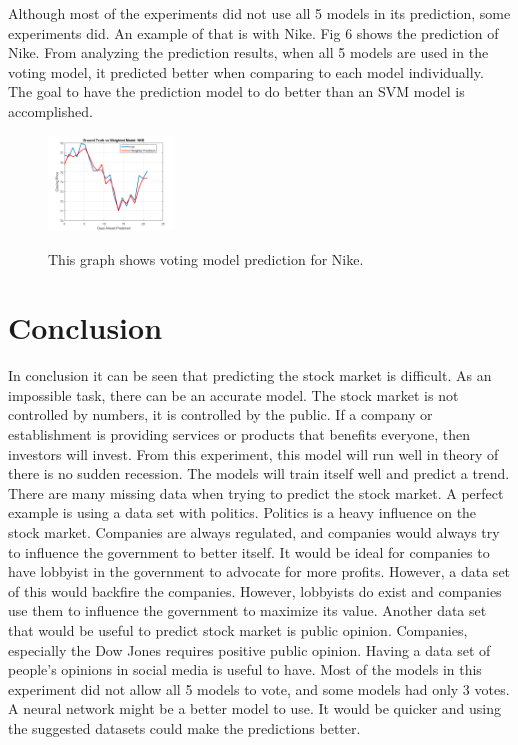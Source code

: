 \documentclass[journal]{IEEEtran}
\begin{document}
Although most of the experiments did not use all 5 models in its prediction, some experiments did. An example of that is with Nike. Fig 6 shows the prediction of Nike. From analyzing the prediction results, when all 5 models are used in the voting model, it predicted better when comparing to each model individually. The goal to have the prediction model to do better than an SVM model is accomplished. 

\begin{figure}[H]
\centering
\includegraphics[width = 0.3\textwidth]{nke.png}
\label{nike}
\caption{This graph shows voting model prediction for Nike.}
\end{figure}

\section{Conclusion}
In conclusion it can be seen that predicting the stock market is difficult. As an impossible task, there can be an accurate model. The stock market is not controlled by numbers, it is controlled by the public. If a company or establishment is providing services or products that benefits everyone, then investors will invest. From this experiment, this model will run well in theory of there is no sudden recession. The models will train itself well and predict a trend. There are many missing data when trying to predict the stock market. A perfect example is using a data set with politics. Politics is a heavy influence on the stock market. Companies are always regulated, and companies would always try to influence the government to better itself. It would be ideal for companies to have lobbyist in the government to advocate for more profits. However, a data set of this would backfire the companies. However, lobbyists do exist and companies use them to influence the government to maximize its value. Another data set that would be useful to predict stock market is public opinion. Companies, especially the Dow Jones requires positive public opinion. Having a data set of people's opinions in social media is useful to have. Most of the models in this experiment did not allow all 5 models to vote, and some models had only 3 votes. A neural network might be a better model to use. It would be quicker and using the suggested datasets could make the predictions better.
\end{document}
